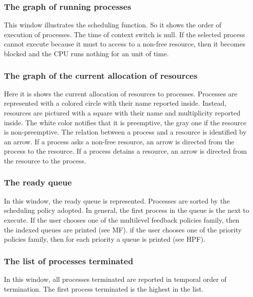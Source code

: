\documentclass[10pt,a4paper,twoside,titlepage]{article}
\begin{document}
\subsubsection{The graph of running processes}
\label{subsubsec:The graph of running processes}
This window illustrates the scheduling function. So it shows the order of execution of processes. The time of context switch is null. If the selected process cannot execute because it must to access to a non-free resource, then it becomes blocked and the CPU runs nothing for an unit of time.

\subsubsection{The graph of the current allocation of resources}
\label{subsubsec:The graph of the current allocation of resources}
Here it is shows the current allocation of resources to processes. Processes are represented with a colored circle with their name reported inside. Instead, resources are pictured with a square with their name and multiplicity reported inside. The white color notifies that it is preemptive, the gray one if the resource is non-preemptive. The relation between a process and a resource is identified by an arrow. If a process asks a non-free resource, an arrow is directed from the process to the resource. If a process detains a resource, an arrow is directed from the resource to the process.

\subsubsection{The ready queue}
\label{subsubsec:The ready queue}
In this window, the ready queue is represented. Processes are sorted by the scheduling policy adopted. In general, the first process in the queue is the next to execute. If the user chooses one of the multilevel feedback policies family, then the indexed queues are printed (see MF). if the user chooses one of the priority policies family, then for each priority a queue is printed (see HPF).

\subsubsection{The list of processes terminated}
\label{subsubsec:The list of processes terminated}
In this window, all processes terminated are reported in temporal order of termination. The first process terminated is the highest in the list.
\end{document}
